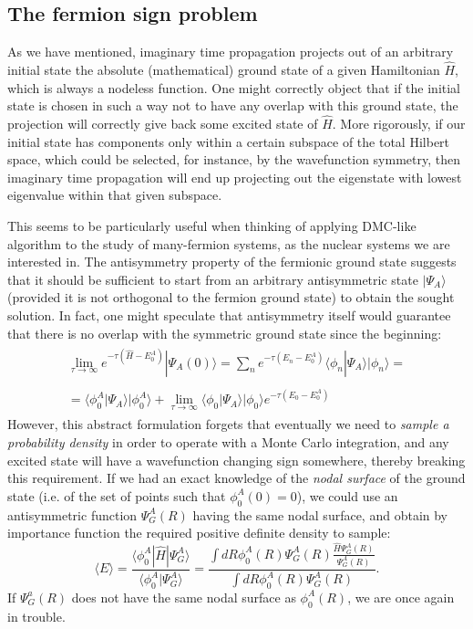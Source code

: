 \subsection{The fermion sign problem}
\label{sec:signprob}
As we have mentioned, imaginary time propagation projects out of an arbitrary initial state the absolute (mathematical) ground state of a given Hamiltonian $\hat{H}$, which is always a nodeless function. One might correctly object that if the initial state is chosen in such a way not to have any overlap with this ground state, the projection will correctly give back some excited state of $\hat{H}$. More rigorously, if our initial state has components only within a certain subspace of the total Hilbert space, which could be selected, for instance, by the wavefunction symmetry, then imaginary time propagation will end up projecting out the eigenstate with lowest eigenvalue within that given subspace.

This seems to be particularly useful when thinking of applying DMC-like algorithm to the study of many-fermion systems, as the nuclear systems we are interested in. The antisymmetry property of the fermionic ground state suggests that it should be sufficient to start from an arbitrary antisymmetric state $|\Psi_A\rangle$(provided it is not orthogonal to the fermion ground state) to obtain the sought solution. In fact, one might speculate that antisymmetry itself would guarantee that there is no overlap with the symmetric ground state since the beginning:
\begin{eqnarray}
\begin{array}{c}
\displaystyle\lim_{\tau\rightarrow\infty} e^{-\tau(\hat{H}-E_0^A)}|\Psi_A(0)\rangle=
\sum_n  e^{-\tau(E_n-E_0^A)}\langle \phi_n|\Psi_A\rangle|\phi_n\rangle=\\ \\
=\langle \phi_0^A|\Psi_A\rangle|\phi_0^A\rangle+\displaystyle\lim_{\tau\rightarrow\infty}\langle \phi_0|\Psi_A\rangle|\phi_0\rangle e^{-\tau(E_0-E_0^A)}
\end{array}
\end{eqnarray}
However, this abstract formulation forgets that eventually we need to {\it sample a probability density} in order to operate with a Monte Carlo integration, and any excited state will have a wavefunction changing sign somewhere, thereby breaking this requirement. If we had an exact knowledge of the {\it nodal surface} of the ground state (i.e. of the set of points such that $\phi_0^A(0)=0$), we could use an antisymmetric function $\Psi_G^A(R)$ having the same nodal surface, and obtain by importance function the required positive definite density to sample:
\begin{equation}
\langle E\rangle =\frac{\displaystyle\langle \phi_0^A|\hat{H}|\Psi_G^A\rangle}{\langle \phi_0^A|\Psi_G^A\rangle}=\frac{\displaystyle\int dR \phi_0^A(R)\Psi_G^A(R)\frac{\hat{H}\Psi_G^A(R)}{\displaystyle\Psi_G^A(R)}}{\displaystyle\int dR \phi_0^A(R)\Psi_G^A(R)}.
\end{equation}
If $\Psi_G^a(R)$ does not have the same nodal surface as $\phi_0^A(R)$, we are once again in trouble. 

